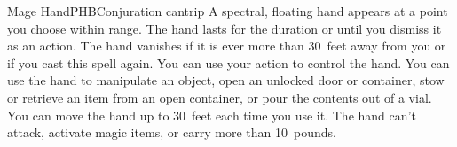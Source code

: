 \begin{spell}{Mage Hand}{PHB}{Conjuration cantrip}
{
}
A spectral, floating hand appears at a point you choose
within range. The hand lasts for the duration or until you
dismiss it as an action. The hand vanishes if it is ever
more than 30~feet away from you or if you cast this spell
again. You can use your action to control the hand. You can
use the hand to manipulate an object, open an unlocked door
or container, stow or retrieve an item from an open
container, or pour the contents out of a vial. You can move
the hand up to 30~feet each time you use it. The hand can't
attack, activate magic items, or carry more than 10~pounds.
\end{spell}
